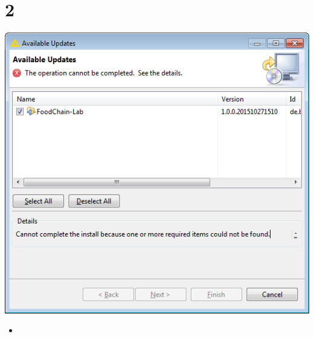 \documentclass{beamer}
\begin{document}
\section{2}
\begin{frame}
	\begin{center}
  		\includegraphics[height=0.6\textheight]{2.png}
	\end{center}
	\begin{itemize}
		\item
	\end{itemize}
\end{frame}
\end{document}
